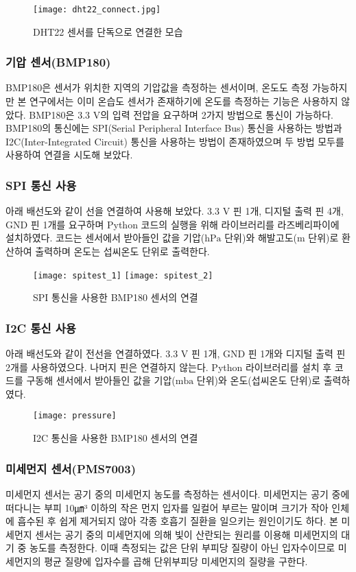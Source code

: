 \begin{figure}[htbp]
	\centering
	\texttt{[image: dht22\_connect.jpg]}
	\caption{DHT22 센서를 단독으로 연결한 모습}
	\label{DHT22}
\end{figure}

\subsubsection{기압 센서(BMP180)}
BMP180은 센서가 위치한 지역의 기압값을 측정하는 센서이며, 온도도 측정 가능하지만 본 연구에서는 이미 온습도 센서가 존재하기에 온도를 측정하는 기능은 사용하지 않았다. BMP180은 3.3 $\textrm{V}$의 입력 전압을 요구하며 2가지 방법으로 통신이 가능하다. BMP180의 통신에는 SPI(Serial Peripheral Interface Bus) 통신을 사용하는 방법과 I2C(Inter-Integrated Circuit) 통신을 사용하는 방법이 존재하였으며 두 방법 모두를 사용하여 연결을 시도해 보았다.
\subsubsection*{SPI 통신 사용}
아래 배선도와 같이 선을 연결하여 사용해 보았다. 3.3 $\textrm{V}$ 핀 1개, 디지털 출력 핀 4개, GND 핀 1개를 요구하며 Python 코드의 실행을 위해 라이브러리를 라즈베리파이에 설치하였다. 코드는 센서에서 받아들인 값을 기압($\textrm{hPa}$ 단위)와 해발고도($\textrm{m}$ 단위)로 환산하여 출력하며 온도는 섭씨온도 단위로 출력한다.

\begin{figure}[htbp]
	\centering
	\texttt{[image: spitest\_1]}
	\texttt{[image: spitest\_2]}
	\caption{SPI 통신을 사용한 BMP180 센서의 연결}
	\label{SPI}
\end{figure}

\subsubsection*{I2C 통신 사용}
아래 배선도와 같이 전선을 연결하였다. 3.3 $\textrm{V}$ 핀 1개, GND 핀 1개와 디지털 출력 핀 2개를 사용하였으다. 나머지 핀은 연결하지 않는다. Python 라이브러리를 설치 후 코드를 구동해 센서에서 받아들인 값을 기압($\textrm{mba}$ 단위)와 온도(섭씨온도 단위)로 출력하였다.

\begin{figure}[htbp]
	\centering
	\texttt{[image: pressure]}
	\caption{I2C 통신을 사용한 BMP180 센서의 연결}
	\label{I2C}
\end{figure}

\subsubsection{미세먼지 센서(PMS7003)}
미세먼지 센서는 공기 중의 미세먼지 농도를 측정하는 센서이다. 미세먼지는 공기 중에 떠다니는 부피 10㎛³ 이하의 작은 먼지 입자를 일컬어 부르는 말이며 크기가 작아 인체에 흡수된 후 쉽게 제거되지 않아 각종 호흡기 질환을 일으키는 원인이기도 하다. 본 미세먼지 센서는 공기 중의 미세먼지에 의해 빛이 산란되는 원리를 이용해 미세먼지의 대기 중 농도를 측정한다. 이때 측정되는 값은 단위 부피당 질량이 아닌 입자수이므로 미세먼지의 평균 질량에 입자수를 곱해 단위부피당 미세먼지의 질량을 구한다. 

